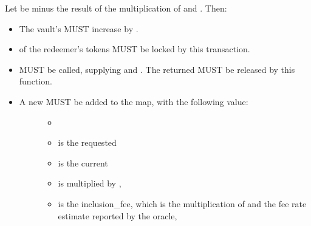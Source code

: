 \documentclass[a4paper,10pt,english]{sphinxmanual}
\begin{document}

Let  be  minus the result of the multiplication of {\hyperref[\detokenize{spec/fee:redeemfee}]{}} and . Then:
\begin{itemize}
\item {} 
The vault’s  MUST increase by .

\item {} 
 of the redeemer’s tokens MUST be locked by this transaction.

\item {} 
{\hyperref[\detokenize{spec/vault-registry:decreasetobereplacedtokens}]{}} MUST be called, supplying  and . The returned  MUST be released by this function.

\item {} \begin{description}
\item[{A new  MUST be added to the  map, with the following value:}] \leavevmode\begin{itemize}
\item {} 
\item {} 
 is the requested 

\item {} 
 is the current {\hyperref[\detokenize{spec/security:activeblockcount}]{}}

\item {} 
 is {\hyperref[\detokenize{spec/fee:redeemfee}]{}} multiplied by ,

\item {} 
 is the inclusion\_fee, which is the multiplication of {\hyperref[\detokenize{spec/redeem:redeemtransactionsize}]{}} and the fee rate estimate reported by the oracle,


\end{itemize}
\end{description}
\end{itemize}
\end{document}
